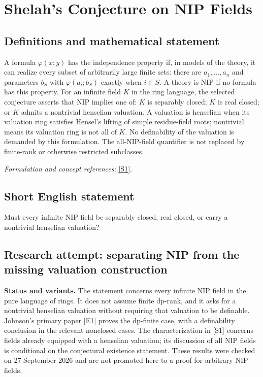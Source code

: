 \documentclass[11pt]{article}
\begin{document}
\section*{\texorpdfstring{Shelah's Conjecture on NIP Fields}{Shelah's Conjecture on NIP Fields}}\label{341}
\subsection{Definitions and mathematical statement}
A formula $\varphi(x;y)$ has the independence property if, in models of the theory, it can realize every subset of arbitrarily large finite sets: there are $a_1,\ldots,a_n$ and parameters $b_S$ with $\varphi(a_i;b_S)$ exactly when $i\in S$. A theory is NIP if no formula has this property. For an infinite field $K$ in the ring language, the selected conjecture asserts that NIP implies one of: $K$ is separably closed; $K$ is real closed; or $K$ admits a nontrivial henselian valuation. A valuation is henselian when its valuation ring satisfies Hensel's lifting of simple residue-field roots; nontrivial means its valuation ring is not all of $K$. No definability of the valuation is demanded by this formulation. The all-NIP-field quantifier is not replaced by finite-rank or otherwise restricted subclasses.
\par\smallskip\textit{Formulation and concept references:} \href{https://arxiv.org/abs/1911.00309}{[S1]}.

\subsection{Short English statement}
Must every infinite NIP field be separably closed, real closed, or carry a nontrivial henselian valuation?
\subsection{Research attempt: separating NIP from the missing valuation construction}
\textbf{Status and variants.} The statement concerns every infinite NIP field in the pure language of rings. It does not assume finite dp-rank, and it asks for a nontrivial henselian valuation without requiring that valuation to be definable. Johnson's primary paper [E1] proves the dp-finite case, with a definability conclusion in the relevant nonclosed cases. The characterization in [S1] concerns fields already equipped with a henselian valuation; its discussion of all NIP fields is conditional on the conjectural existence statement. These results were checked on 27 September 2026 and are not promoted here to a proof for arbitrary NIP fields.
\end{document}

